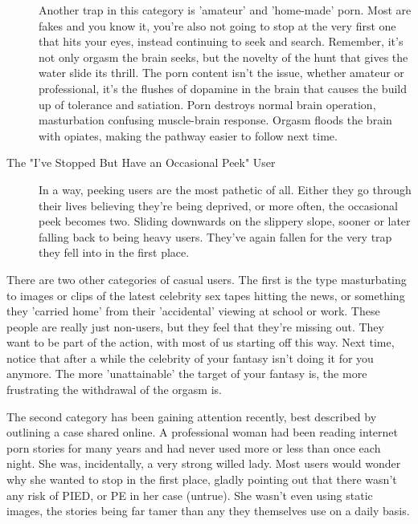 \documentclass[easypeasy]{subfiles}
\begin{document}
\begin{description}
  Another trap in this category is 'amateur' and 'home-made' porn. Most are fakes and you know it, you're also not going to stop at the very first one that hits your eyes, instead continuing to seek and search. Remember, it's not only orgasm the brain seeks, but the novelty of the hunt that gives the water slide its thrill. The porn content isn't the issue, whether amateur or professional, it's the flushes of dopamine in the brain that causes the build up of tolerance and satiation. Porn destroys normal brain operation, masturbation confusing muscle-brain response. Orgasm floods the brain with opiates, making the pathway easier to follow next time.

\item[The "I've Stopped But Have an Occasional Peek" User] In a way, peeking users are the most pathetic of all. Either they go through their lives believing they're being deprived, or more often, the occasional peek becomes two. Sliding downwards on the slippery slope, sooner or later falling back to being heavy users. They've again fallen for the very trap they fell into in the first place.
 \end{description}

There are two other categories of casual users. The first is the type masturbating to images or clips of the latest celebrity sex tapes hitting the news, or something they 'carried home' from their 'accidental' viewing at school or work. These people are really just non-users, but they feel that they're missing out. They want to be part of the action, with most of us starting off this way. Next time, notice that after a while the celebrity of your fantasy isn't doing it for you anymore. The more 'unattainable' the target of your fantasy is, the more frustrating the withdrawal of the orgasm is.

The second category has been gaining attention recently, best described by outlining a case shared online. A professional woman had been reading internet porn stories for many years and had never used more or less than once each night. She was, incidentally, a very strong willed lady. Most users would wonder why she wanted to stop in the first place, gladly pointing out that there wasn't any risk of PIED, or PE in her case (untrue). She wasn't even using static images, the stories being far tamer than any they themselves use on a daily basis.
\end{document}
